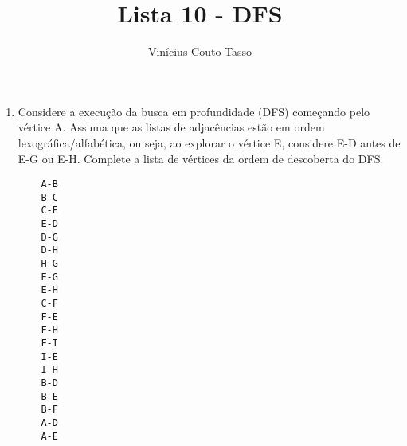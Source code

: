 \documentclass{article}
\title{Lista 10 - DFS}
\author{Vinícius Couto Tasso}
\date{}
\begin{document}
\maketitle
         
\begin{enumerate}

\item Considere a execução da busca em profundidade (DFS) começando pelo vértice A. Assuma que as listas de adjacências estão em ordem lexográfica/alfabética, ou seja, ao explorar o vértice E, considere E-D antes de E-G ou E-H. Complete a lista de vértices da ordem de descoberta do DFS.

\begin{verbatim}
    A-B 
    B-C 
    C-E 
    E-D 
    D-G
    D-H
    H-G
    E-G
    E-H
    C-F
    F-E
    F-H
    F-I
    I-E
    I-H
    B-D
    B-E
    B-F
    A-D
    A-E
\end{verbatim}

\end{enumerate}
\end{document}

